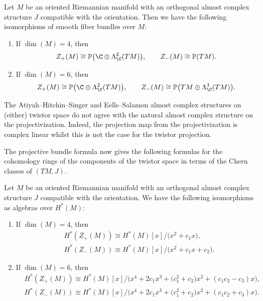 \begin{Proposition}\label{identification}
Let $M$ be an oriented Riemannian manifold with an orthogonal almost complex structure $J$ compatible with the orientation. Then we have the following isomorphisms of smooth fiber bundles over $M$:
\begin{enumerate}\itemsep=0pt
\item[$1.$] If $\dim(M)=4$, then
\[
Z_+(M) \cong \mathbb{P}\big( \C \oplus \Lambda^2_\C(TM)\big), \qquad Z_{-}(M) \cong \mathbb{P}( TM).
\]
\item[$2.$] If $\dim(M)=6$, then
\[
Z_+(M) \cong \mathbb{P}\big( \C \oplus \Lambda^2_\C(TM)\big), \qquad Z_{-}(M) \cong \mathbb{P}\big( TM \oplus \Lambda_\C^3(TM)\big).
\]
\end{enumerate}
\end{Proposition}

\begin{Remark}
 The Atiyah--Hitchin--Singer and Eells--Salamon almost complex structures on (either) twistor space do not agree with the natural almost complex structure on the projectivization. Indeed, the projection map from the projectivization is complex linear whilst this is not the case for the twistor projection.
\end{Remark}

The projective bundle formula now gives the following formulas for the cohomology rings of the components of the twistor space in terms of the
Chern classes of $(TM, J)$.

\begin{Corollary}
\label{cohomtwis}
Let $M$ be an oriented Riemannian manifold with an orthogonal almost complex structure $J$ compatible with the orientation. We have the following isomorphisms as algebras over $H^*(M)$:
\begin{enumerate}\itemsep=0pt
\item[$1.$] If $\dim(M)=4$, then
\begin{align*}
&H^*(Z_+(M))\cong H^*(M)[x]/\big(x^2+c_1 x\big), \\
&H^*(Z_{-}(M))\cong H^*(M)[x]/\big(x^2 + c_1 x + c_2\big).
\end{align*}
\item[$2.$] If $\dim(M)=6$, then
\begin{align*}
&H^*(Z_+(M))\cong H^*(M)[x]/\big(x^4 +2c_1x^3 +\big(c_1^2+c_2\big) x^2 + (c_1c_2-c_3)x\big), \\
&H^*(Z_{-}(M))\cong H^*(M)[x]/\big(x^4 + 2c_1x^3+ \big(c_1^2+c_2\big)x^2 + (c_1c_2+c_3)x\big). \end{align*}
\end{enumerate}
\end{Corollary}
